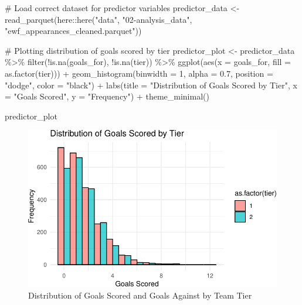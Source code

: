\documentclass[
  letterpaper,
  DIV=11,
  numbers=noendperiod]{scrartcl}
\newenvironment{Shaded}{\begin{snugshade}}{\end{snugshade}}
\newcommand{\AttributeTok}[1]{\textcolor[rgb]{0.40,0.45,0.13}{#1}}
\newcommand{\CommentTok}[1]{\textcolor[rgb]{0.37,0.37,0.37}{#1}}
\newcommand{\DecValTok}[1]{\textcolor[rgb]{0.68,0.00,0.00}{#1}}
\newcommand{\FloatTok}[1]{\textcolor[rgb]{0.68,0.00,0.00}{#1}}
\newcommand{\FunctionTok}[1]{\textcolor[rgb]{0.28,0.35,0.67}{#1}}
\newcommand{\NormalTok}[1]{\textcolor[rgb]{0.00,0.23,0.31}{#1}}
\newcommand{\OtherTok}[1]{\textcolor[rgb]{0.00,0.23,0.31}{#1}}
\newcommand{\SpecialCharTok}[1]{\textcolor[rgb]{0.37,0.37,0.37}{#1}}
\newcommand{\StringTok}[1]{\textcolor[rgb]{0.13,0.47,0.30}{#1}}
\begin{document}
\begin{Shaded}
\begin{Highlighting}[]
\CommentTok{\# Load correct dataset for predictor variables}
\NormalTok{predictor\_data }\OtherTok{\textless{}{-}} \FunctionTok{read\_parquet}\NormalTok{(here}\SpecialCharTok{::}\FunctionTok{here}\NormalTok{(}\StringTok{"data"}\NormalTok{, }\StringTok{"02{-}analysis\_data"}\NormalTok{, }\StringTok{"ewf\_appearances\_cleaned.parquet"}\NormalTok{))}

\CommentTok{\# Plotting distribution of goals scored by tier}
\NormalTok{predictor\_plot }\OtherTok{\textless{}{-}}\NormalTok{ predictor\_data }\SpecialCharTok{\%\textgreater{}\%}
  \FunctionTok{filter}\NormalTok{(}\SpecialCharTok{!}\FunctionTok{is.na}\NormalTok{(goals\_for), }\SpecialCharTok{!}\FunctionTok{is.na}\NormalTok{(tier)) }\SpecialCharTok{\%\textgreater{}\%}
  \FunctionTok{ggplot}\NormalTok{(}\FunctionTok{aes}\NormalTok{(}\AttributeTok{x =}\NormalTok{ goals\_for, }\AttributeTok{fill =} \FunctionTok{as.factor}\NormalTok{(tier))) }\SpecialCharTok{+}
  \FunctionTok{geom\_histogram}\NormalTok{(}\AttributeTok{binwidth =} \DecValTok{1}\NormalTok{, }\AttributeTok{alpha =} \FloatTok{0.7}\NormalTok{, }\AttributeTok{position =} \StringTok{"dodge"}\NormalTok{, }\AttributeTok{color =} \StringTok{"black"}\NormalTok{) }\SpecialCharTok{+}
  \FunctionTok{labs}\NormalTok{(}\AttributeTok{title =} \StringTok{"Distribution of Goals Scored by Tier"}\NormalTok{, }\AttributeTok{x =} \StringTok{"Goals Scored"}\NormalTok{, }\AttributeTok{y =} \StringTok{"Frequency"}\NormalTok{) }\SpecialCharTok{+}
  \FunctionTok{theme\_minimal}\NormalTok{()}

\NormalTok{predictor\_plot}
\end{Highlighting}
\end{Shaded}

\begin{figure}[H]

{\centering \includegraphics{paper_files/figure-pdf/fig-predictor-distribution-1.pdf}

}

\caption{\label{fig-predictor-distribution}Distribution of Goals Scored
and Goals Against by Team Tier}

\end{figure}
\end{document}
